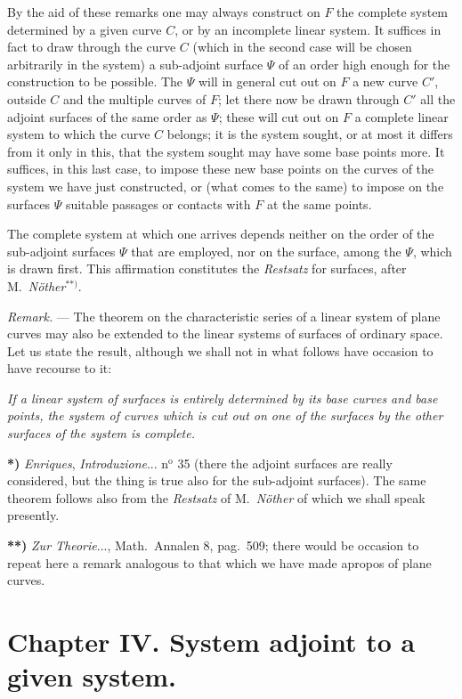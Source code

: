 \documentclass{article}
\begin{document}
By the aid of these remarks one may always construct on $F$ the complete system determined by a given curve $C$, or by an incomplete linear system. It suffices in fact to draw through the curve $C$ (which in the second case will be chosen arbitrarily in the system) a sub-adjoint surface $\Psi$ of an order high enough for the construction to be possible. The $\Psi$ will in general cut out on $F$ a new curve $C'$, outside $C$ and the multiple curves of $F$; let there now be drawn through $C'$ all the adjoint surfaces of the same order as $\Psi$; these will cut out on $F$ a complete linear system to which the curve $C$ belongs; it is the system sought, or at most it differs from it only in this, that the system sought may have some base points more. It suffices, in this last case, to impose these new base points on the curves of the system we have just constructed, or (what comes to the same) to impose on the surfaces $\Psi$ suitable passages or contacts with $F$ at the same points.

The complete system at which one arrives depends neither on the order of the sub-adjoint surfaces $\Psi$ that are employed, nor on the surface, among the $\Psi$, which is drawn first. This affirmation constitutes the \emph{Restsatz} for surfaces, after M.\ \emph{Nöther}${}^{**)}$.

\emph{Remark.} --- The theorem on the characteristic series of a linear system of plane curves may also be extended to the linear systems of surfaces of ordinary space. Let us state the result, although we shall not in what follows have occasion to have recourse to it:

\emph{If a linear system of surfaces is entirely determined by its base curves and base points, the system of curves which is cut out on one of the surfaces by the other surfaces of the system is complete.}

\textbf{*)} \emph{Enriques}, \emph{Introduzione}... n${}^{\text{o}}$ 35 (there the adjoint surfaces are really considered, but the thing is true also for the sub-adjoint surfaces). The same theorem follows also from the \emph{Restsatz} of M.\ \emph{Nöther} of which we shall speak presently.

\textbf{**)} \emph{Zur Theorie}..., Math.\ Annalen 8, pag.\ 509; there would be occasion to repeat here a remark analogous to that which we have made apropos of plane curves.


\section*{Chapter IV. System adjoint to a given system.}
\end{document}
